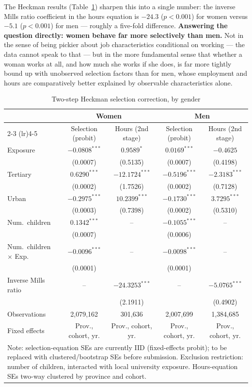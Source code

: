 \documentclass[11pt]{article}
\begin{document}
The Heckman results (Table~\ref{tab:exhibit4}) sharpen this into a single number: the inverse Mills ratio coefficient in the hours equation is $-24.3$ ($p<0.001$) for women versus $-5.1$ ($p<0.001$) for men --- roughly a five-fold difference. \textbf{Answering the question directly: women behave far more selectively than men.} Not in the sense of being pickier about job characteristics conditional on working --- the data cannot speak to that --- but in the more fundamental sense that whether a woman works at all, and how much she works if she does, is far more tightly bound up with unobserved selection factors than for men, whose employment and hours are comparatively better explained by observable characteristics alone.

\begin{table}[htbp]
\centering
\caption{Two-step Heckman selection correction, by gender}
\label{tab:exhibit4}
\begin{tabular}{lcccc}
\toprule
 & \multicolumn{2}{c}{Women} & \multicolumn{2}{c}{Men} \\
 \cmidrule(lr){2-3} \cmidrule(lr){4-5}
 & Selection (probit) & Hours (2nd stage) & Selection (probit) & Hours (2nd stage) \\
\midrule
Exposure & $-0.0808^{***}$ & $0.9589^{*}$ & $0.0169^{***}$ & $-0.4625$ \\
 & (0.0007) & (0.5135) & (0.0007) & (0.4198) \\
Tertiary & $0.6290^{***}$ & $-12.1724^{***}$ & $-0.5196^{***}$ & $-2.3183^{***}$ \\
 & (0.0002) & (1.7526) & (0.0002) & (0.7128) \\
Urban & $-0.2975^{***}$ & $10.2399^{***}$ & $-0.1730^{***}$ & $3.7295^{***}$ \\
 & (0.0003) & (0.7398) & (0.0002) & (0.5310) \\
Num.\ children & $0.1342^{***}$ & -- & $-0.1055^{***}$ & -- \\
 & (0.0007) & & (0.0006) & \\
Num.\ children $\times$ Exp. & $-0.0096^{***}$ & -- & $-0.0098^{***}$ & -- \\
 & (0.0001) & & (0.0001) & \\
Inverse Mills ratio & -- & $-24.3253^{***}$ & -- & $-5.0765^{***}$ \\
 & & (2.1911) & & (0.4902) \\
\midrule
Observations & 2,079,162 & 301,636 & 2,007,699 & 1,384,685 \\
Fixed effects & Prov., cohort, yr. & Prov., cohort, yr. & Prov., cohort, yr. & Prov., cohort, yr. \\
\bottomrule
\multicolumn{5}{p{0.95\textwidth}}{\footnotesize Note: selection-equation SEs are currently IID (fixed-effects probit); to be replaced with clustered/bootstrap SEs before submission. Exclusion restriction: number of children, interacted with local university exposure. Hours-equation SEs two-way clustered by province and cohort.}
\end{tabular}
\end{table}
\end{document}
